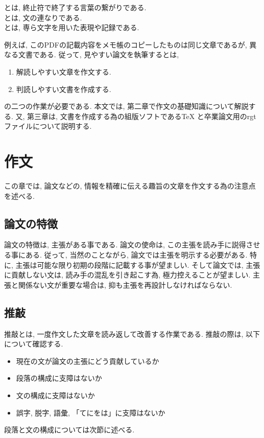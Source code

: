 \documentclass[12pt,xelatex,ja=standard]{bxjsarticle}
\begin{document}
\begin{Definition}
とは, 終止符で終了する言葉の繋がりである.\\
とは, 文の連なりである.\\
とは, 専ら文字を用いた表現や記録である.
\end{Definition}

例えば, このPDFの記載内容をメモ帳のコピーしたものは同じ文章であるが,
異なる文書である.
従って, 見やすい論文を執筆するとは,
\begin{enumerate}
\item 解読しやすい文章を作文する.
\item 判読しやすい文書を作成する.
\end{enumerate}
の二つの作業が必要である.
本文では,
第二章で作文の基礎知識について解説する.
又, 第三章は, 文書を作成する為の組版ソフトである\TeX
と卒業論文用のrgtファイルについて説明する.

\section{作文}
この章では,
論文などの, 情報を精確に伝える趣旨の文章を作文する為の注意点を述べる.

\subsection{論文の特徴}
論文の特徴は,
主張がある事である.
論文の使命は,
この主張を読み手に説得させる事にある.
従って, 当然のことながら,
論文では主張を明示する必要がある.
特に,
主張は可能な限り初期の段階に記載する事が望ましい.
そして論文では,
主張に貢献しない文は, 読み手の混乱を引き起こす為,
極力控えることが望ましい.
主張と関係ない文が重要な場合は,
抑も主張を再設計しなければならない.

\subsection{推敲}
推敲とは,
一度作文した文章を読み返して改善する作業である.
推敲の際は, 以下について確認する.
\begin{itemize}
\item
現在の文が論文の主張にどう貢献しているか
\item
段落の構成に支障はないか
\item
文の構成に支障はないか
\item
誤字, 脱字, 語彙, 「てにをは」に支障はないか
\end{itemize}
段落と文の構成については次節に述べる.
\end{document}
